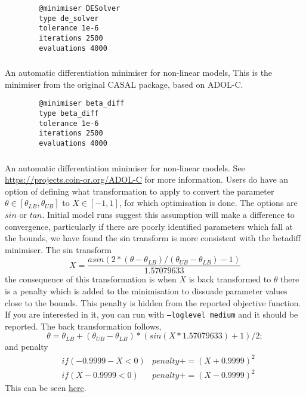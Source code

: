 {\small{\begin{verbatim}
		@minimiser DESolver
		type de_solver
		tolerance 1e-6
		iterations 2500
		evaluations 4000
\end{verbatim}}}

\subsubsection{}\label{sec:Minimiser-BetaDiff}

An automatic differentiation minimiser for non-linear models, This is the minimiser from the original CASAL package, based on ADOL-C.

{\small{\begin{verbatim}
		@minimiser beta_diff
		type beta_diff
		tolerance 1e-6
		iterations 2500
		evaluations 4000
\end{verbatim}}}

\subsubsection{}\label{sec:Minimiser-ADOLC}

An automatic differentiation minimiser for non-linear models. See \url{https://projects.coin-or.org/ADOL-C} for more information. Users do have an option of defining what transformation to apply to convert the parameter \(\theta \in [\theta_{LB}, \theta_{UB}]\) to \(X \in [-1, 1]\), for which optimisation is done. The options are $sin$ or $tan$. Initial model runs suggest this assumption will make a difference to convergence, particularly if there are poorly identified parameters which fall at the bounds, we have found the sin transform is more consistent with the betadiff minimiser. The sin transform
\begin{equation}
	X = \frac{asin(2 * (\theta - \theta_{LB}) / (\theta_{UB} - \theta_{LB}) - 1)}{ 1.57079633}
\end{equation}
%
the consequence of this transformation is when \(X\) is back transformed to \(\theta\) there is a penalty which is added to the minimisation to dissuade parameter values close to the bounds. This penalty is hidden from the reported objective function. If you are interested in it, you can run with \texttt{--loglevel medium} and it should be reported. The back transformation follows,
\begin{equation}
\theta = \theta_{LB} + (\theta_{UB} - \theta_{LB}) * (sin(X * 1.57079633) + 1) / 2;
\end{equation}
%
and penalty
\begin{align}
	&if(-0.9999 - X < 0) & penalty += (X + 0.9999)^2\\
	&if(X - 0.9999 < 0) & penalty += (X - 0.9999)^2
\end{align}
%
This can be seen  \href{https://github.com/NIWAFisheriesModelling/CASAL2/blob/1b1ed731537dc551674c911da3bf387273a97a92/CASAL2/source/Utilities/Math.h#L245}{here}.


